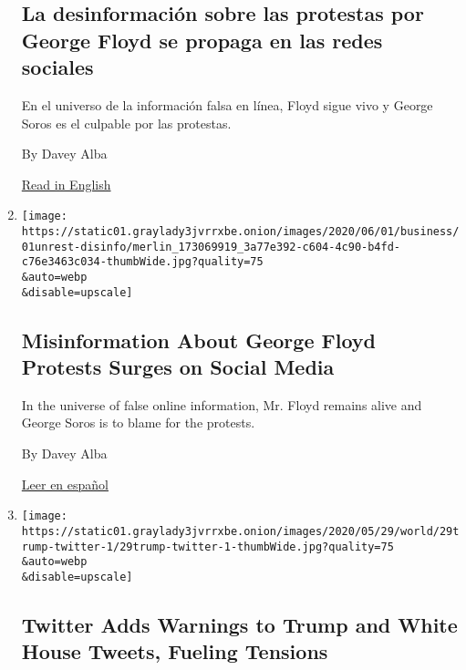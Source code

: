 \begin{enumerate}
  \hypertarget{la-desinformaciuxf3n-sobre-las-protestas-por-george-floyd-se-propaga-en-las-redes-sociales}{%
  \subsection{La desinformación sobre las protestas por George Floyd se
  propaga en las redes
  sociales}\label{la-desinformaciuxf3n-sobre-las-protestas-por-george-floyd-se-propaga-en-las-redes-sociales}}

  En el universo de la información falsa en línea, Floyd sigue vivo y
  George Soros es el culpable por las protestas.

  By Davey Alba

  \href{https://www.nytimes3xbfgragh.onion/2020/06/01/technology/george-floyd-misinformation-online.html}{Read
  in English}
\item
  \href{/2020/06/01/technology/george-floyd-misinformation-online.html}{}

  \texttt{[image: https://static01.graylady3jvrrxbe.onion/images/2020/06/01/business/01unrest-disinfo/merlin\_173069919\_3a77e392-c604-4c90-b4fd-c76e3463c034-thumbWide.jpg?quality=75\\\&auto=webp\\\&disable=upscale]}

  \hypertarget{misinformation-about-george-floyd-protests-surges-on-social-media}{%
  \subsection{Misinformation About George Floyd Protests Surges on
  Social
  Media}\label{misinformation-about-george-floyd-protests-surges-on-social-media}}

  In the universe of false online information, Mr. Floyd remains alive
  and George Soros is to blame for the protests.

  By Davey Alba

  \href{https://www.nytimes3xbfgragh.onion/es/2020/06/03/espanol/ciencia-y-tecnologia/george-floyd-desinformacion-fake-news.html}{Leer
  en español}
\item
  \href{/2020/05/29/technology/trump-twitter-minneapolis-george-floyd.html}{}

  \texttt{[image: https://static01.graylady3jvrrxbe.onion/images/2020/05/29/world/29trump-twitter-1/29trump-twitter-1-thumbWide.jpg?quality=75\\\&auto=webp\\\&disable=upscale]}

  \hypertarget{twitter-adds-warnings-to-trump-and-white-house-tweets-fueling-tensions}{%
  \subsection{Twitter Adds Warnings to Trump and White House Tweets,
  Fueling
  Tensions}\label{twitter-adds-warnings-to-trump-and-white-house-tweets-fueling-tensions}}


\end{enumerate}
